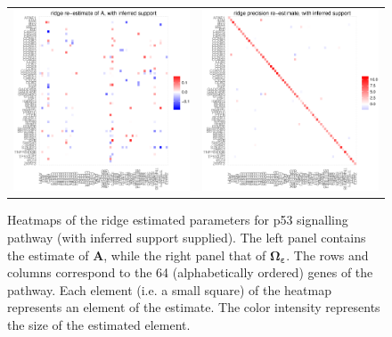 \documentclass[a4paper]{article}
\begin{document}
\begin{figure}[h!]
\centering
\begin{tabular}{cc}
\includegraphics[scale=0.3]{Ahat_sparse.eps}
&
\includegraphics[scale=0.3]{Phat_sparse.eps}
\end{tabular}
\caption{Heatmaps of the ridge estimated parameters for p53 signalling pathway (with inferred support supplied). The left panel contains the estimate of $\mathbf{A}$, while the right panel that of $\boldsymbol{\Omega_{\varepsilon}}$. The rows and columns correspond to the 64 (alphabetically ordered) genes of the pathway. Each element (i.e. a small square) of the heatmap represents an element of the estimate. The color intensity represents the size of the estimated element.
}
\label{figSM:ridgeEstimates_sparse}
\end{figure}
\end{document}
